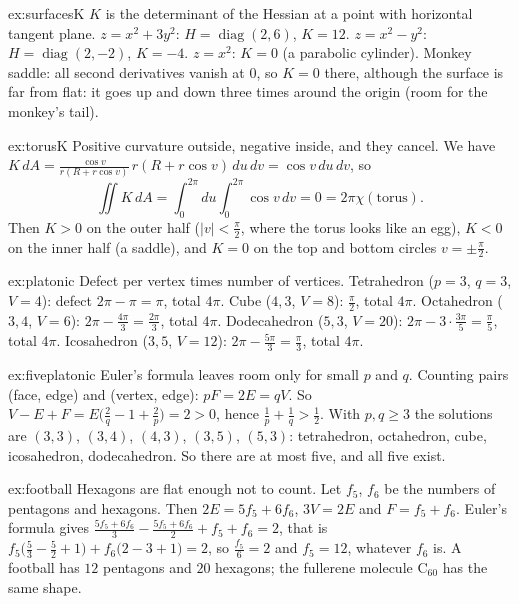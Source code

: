 \begin{solution}{ex:surfacesK}
\idea $K$ is the determinant of the Hessian at a point with horizontal tangent plane.
\writeup $z=x^2+3y^2$: $H=\operatorname{diag}(2,6)$, $K=12$. $z=x^2-y^2$: $H=\operatorname{diag}(2,-2)$, $K=-4$. $z=x^2$: $K=0$ (a parabolic cylinder). Monkey saddle:
all second derivatives vanish at $0$, so $K=0$ there, although the surface is far from flat: it goes up and down three times around the origin (room for the
monkey's tail).
\end{solution}

\begin{solution}{ex:torusK}
\idea Positive curvature outside, negative inside, and they cancel.
\writeup We have $K\,dA=\frac{\cos v}{r(R+r\cos v)}\,r(R+r\cos v)\,du\,dv=\cos v\,du\,dv$, so
\[\iint K\,dA=\int_0^{2\pi}du\int_0^{2\pi}\cos v\,dv=0=2\pi\chi(\text{torus}).\]
Then $K>0$ on the outer half
($|v|<\frac\pi2$, where the torus looks like an egg), $K<0$ on the inner half (a saddle), and $K=0$ on the top and bottom circles $v=\pm\frac\pi2$.
\end{solution}

\begin{solution}{ex:platonic}
\idea Defect per vertex times number of vertices.
\writeup Tetrahedron ($p=3$, $q=3$, $V=4$): defect $2\pi-\pi=\pi$, total $4\pi$. Cube ($4,3$, $V=8$): $\frac\pi2$, total $4\pi$. Octahedron ($3,4$, $V=6$): $2\pi-\frac{4\pi}3=\frac{2\pi}3$, total
$4\pi$. Dodecahedron ($5,3$, $V=20$): $2\pi-3\cdot\frac{3\pi}5=\frac\pi5$, total $4\pi$. Icosahedron ($3,5$, $V=12$): $2\pi-\frac{5\pi}3=\frac\pi3$, total $4\pi$.
\end{solution}

\begin{solution}{ex:fiveplatonic}
\idea Euler's formula leaves room only for small $p$ and $q$.
\writeup Counting pairs (face, edge) and (vertex, edge): $pF=2E=qV$. So $V-E+F=E\bigl(\frac2q-1+\frac2p\bigr)=2>0$, hence $\frac1p+\frac1q>\frac12$. With $p,q\ge3$ the
solutions are $(3,3)$, $(3,4)$, $(4,3)$, $(3,5)$, $(5,3)$: tetrahedron, octahedron, cube, icosahedron, dodecahedron. So there are at most five, and all five exist.
\end{solution}

\begin{solution}{ex:football}
\idea Hexagons are flat enough not to count.
\writeup Let $f_5$, $f_6$ be the numbers of pentagons and hexagons. Then $2E=5f_5+6f_6$, $3V=2E$ and $F=f_5+f_6$. Euler's formula gives
$\frac{5f_5+6f_6}3-\frac{5f_5+6f_6}2+f_5+f_6=2$, that is $f_5\bigl(\frac53-\frac52+1\bigr)+f_6\bigl(2-3+1\bigr)=2$, so $\frac{f_5}6=2$ and $f_5=12$, whatever $f_6$ is. A football
has $12$ pentagons and $20$ hexagons; the fullerene molecule C$_{60}$ has the same shape.
\end{solution}

